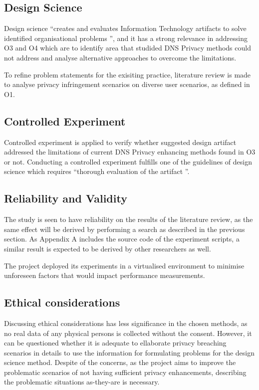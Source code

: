 \documentclass[a4paper,12pt]{article}
\begin{document}
\subsection{Design Science}
Design science ``creates and evaluates Information Technology artifacts to solve identified organisational problems \cite{von2004design}'', and it has a strong relevance in addressing O3 and O4 which are to identify area that studided DNS Privacy methods could not address and analyse alternative approaches to overcome the limitations.

To refine problem statements for the exisiting practice, literature review is made to analyse privacy infringement scenarios on diverse user scenarios, as defined in O1.

\subsection{Controlled Experiment}
Controlled experiment is applied to verify whether suggested design artifact addressed the limitations of current DNS Privacy enhancing methods found in O3 or not. Conducting a controlled experiment fulfills one of the guidelines of design science which requires ``thorough evaluation of the artifact \cite{von2004design}''.

\subsection{Reliability and Validity}
The study is seen to have reliability on the results of the literature review, as the same effect will be derived by performing a search as described in the previous section. As Appendix A includes the source code of the experiment scripts, a similar result is expected to be derived by other researchers as well. 

The project deployed its experiments in a virtualised environment to minimise unforeseen factors that would impact performance measurements.

\subsection{Ethical considerations}
Discussing ethical considerations has less significance in the chosen methods, as no real data of any physical persons is collected without the consent.
However, it can be questioned whether it is adequate to ellaborate privacy breaching scenarios in details to use the information for formulating problems for the design science method.
Despite of the concerns, as the project aims to improve the problematic scenarios of not having sufficient privacy enhancements, describing the problematic situations as-they-are is necessary.
\end{document}
